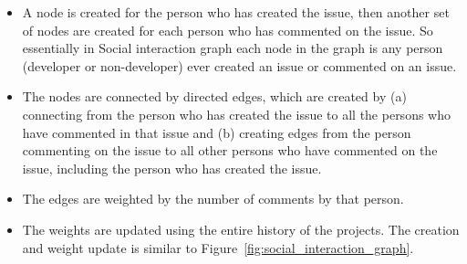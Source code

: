 \documentclass[smallextended]{svjour3}
\newcommand{\bi}{\begin{itemize}}
\newcommand{\ei}{\end{itemize}}
\begin{document}
\bi
\item
 A node is created for the person who has created the issue, then another set of nodes are created for each person who has commented on the issue. So essentially in Social interaction graph each node in the graph is any person (developer or non-developer) ever created an issue or commented on an issue.
 \item
 The nodes are connected by directed edges, which are created by (a) connecting from the person who has created the issue to all the persons who have commented in that issue and (b) creating edges from the person commenting on the issue to all other persons who have commented on the issue, including the person who has created the issue. 
 \item
 The edges are weighted by the number of comments by that person. 
 \item
 The weights are updated using the entire history of the projects. The creation and weight update is similar to Figure~\ref{fig:social_interaction_graph}.
 \ei
\end{document}
